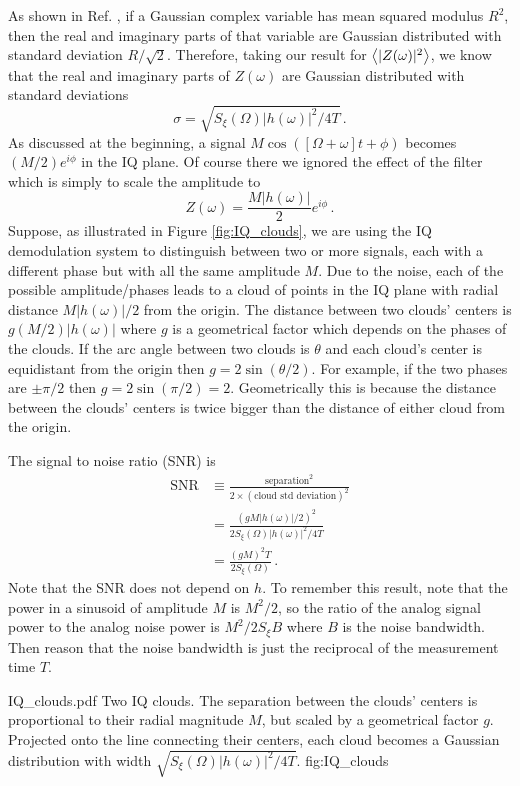 As shown in Ref. \cite{Sank:whiteNoiseDFT}, if a Gaussian complex variable has mean squared modulus $R^2$, then the real and imaginary parts of that variable are Gaussian distributed with standard deviation $R / \sqrt{2}$.
Therefore, taking our result for $\left\langle |Z(\omega)|^2 \right\rangle$, we know that the real and imaginary parts of $Z(\omega)$ are Gaussian distributed with standard deviations
\begin{equation}
\sigma = \sqrt{S_\xi(\Omega) |h(\omega)|^2 / 4 T} \, .
\end{equation}
As discussed at the beginning, a signal $M \cos([\Omega + \omega] t + \phi)$ becomes $(M/2)e^{i \phi}$ in the IQ plane.
Of course there we ignored the effect of the filter which is simply to scale the amplitude to
\begin{equation}
Z(\omega) = \frac{M |h(\omega)|}{2} e^{i \phi} \, .
\end{equation}
Suppose, as illustrated in Figure \ref{fig:IQ_clouds}, we are using the IQ demodulation system to distinguish between two or more signals, each with a different phase but with all the same amplitude $M$.
Due to the noise, each of the possible amplitude/phases leads to a cloud of points in the IQ plane with radial distance $M |h(\omega)|/2$ from the origin.
The distance between two clouds' centers is $g(M/2)|h(\omega)|$ where $g$ is a geometrical factor which depends on the phases of the clouds.
If the arc angle between two clouds is $\theta$ and each cloud's center is equidistant from the origin then $g = 2 \sin(\theta / 2)$.
For example, if the two phases are $\pm\pi/2$ then $g=2 \sin(\pi/2) = 2$.
Geometrically this is because the distance between the clouds' centers is twice bigger than the distance of either cloud from the origin.

The signal to noise ratio (SNR) is
\begin{align}
\text{SNR}
& \equiv \frac{\text{separation}^2}{2 \times (\text{cloud std deviation})^2} \\
&= \frac{(g M |h(\omega)|/2)^2}{2 S_\xi(\Omega) |h(\omega)|^2 / 4T} \\
&= \frac{(g M)^2 T}{2 S_\xi(\Omega)}\, .
\end{align}
Note that the SNR does not depend on $h$.
To remember this result, note that the power in a sinusoid of amplitude $M$ is $M^2/2$, so the ratio of the analog signal power to the analog noise power is $M^2 / 2 S_\xi B$ where $B$ is the noise bandwidth.
Then reason that the noise bandwidth is just the reciprocal of the measurement time $T$.

{IQ_clouds.pdf}
{Two IQ clouds. The separation between the clouds' centers is proportional to their radial magnitude $M$, but scaled by a geometrical factor $g$. Projected onto the line connecting their centers, each cloud becomes a Gaussian distribution with width $\sqrt{S_\xi(\Omega)|h(\omega)|^2/4T}$.}
{fig:IQ_clouds}
